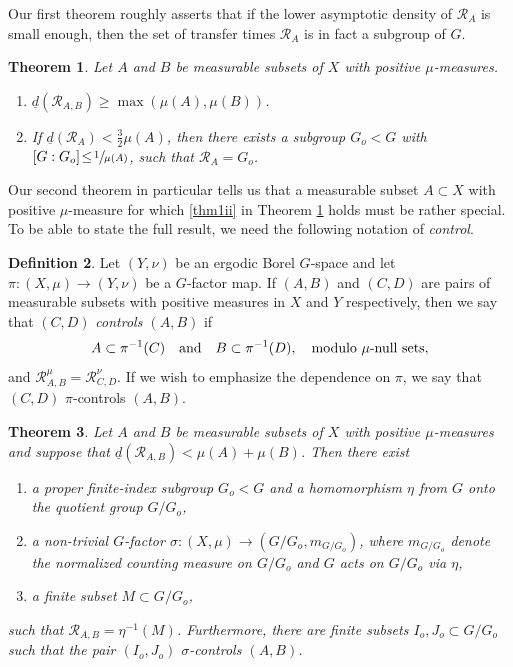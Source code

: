 \documentclass[10pt]{amsart}
\let\mathcal\mathscr
\newcommand{\cR}{\mathcal{R}}
\newcommand{\qand}{\quad\textup{and}\quad}
\theoremstyle{plain}
\newtheorem{theorem}{Theorem}[section]
\theoremstyle{definition}
\newtheorem{definition}[theorem]{Definition}
\begin{document}
Our first theorem roughly asserts that if the lower asymptotic density of $\cR_A$ is small enough, then the set of transfer times $\cR_A$ is in fact a
subgroup of $G$.
\begin{theorem}
\label{thm1}
Let $A$ and $B$ be measurable subsets of $X$ with positive $\mu$-measures.

\begin{enumerate}
\item\label{thm1i}
$\underline{d}(\cR_{A,B}) \geq \max(\mu(A),\mu(B))$.
\item\label{thm1ii}
If $\underline{d}(\cR_A)\!<\!\frac{3}{2} \mu(A)$, then there exists a subgroup $G_o\!<\!G$ with
$[G : G_o]\!\leq\!\sfrac{1}{\mu(A)}$, such that $\cR_A = G_o$.
\end{enumerate}
\end{theorem}

Our second theorem in particular tells us that a measurable subset $A \subset X$ with positive $\mu$-measure for which \eqref{thm1ii} in Theorem \ref{thm1} holds must be rather special. To be able to state the full result, we need the following notation of \emph{control}.

\begin{definition}
Let $(Y,\nu)$ be an ergodic Borel $G$-space and let $\pi : (X,\mu) \to (Y,\nu)$ be a $G$-factor map. If $(A,B)$ and $(C,D)$ are pairs of measurable
subsets with positive measures in $X$ and $Y$ respectively, then we say that $(C,D)$ \emph{controls $(A,B)$} if
\[
A \subset \pi^{-1}(C) \qand B \subset \pi^{-1}(D), \quad \textrm{modulo $\mu$-null sets},
\]
and $\cR^\mu_{A,B} = \cR^\nu_{C,D}$. If we wish to emphasize the dependence on $\pi$, we say that $(C,D)$ $\pi$-controls $(A,B)$.
\end{definition}


\begin{theorem}									
\label{thm2}
Let $A$ and $B$ be measurable subsets of $X$ with positive $\mu$-measures and suppose that $\underline{d}(\cR_{A,B}) < \mu(A) + \mu(B)$. Then there exist

\begin{enumerate}
\item
a proper finite-index subgroup $G_o < G$ and a homomorphism $\eta$ from $G$ onto the quotient group $G/G_o$,
\item
a non-trivial $G$-factor $\sigma : (X,\mu) \to (G/G_o,m_{G/G_o})$, where $m_{G/G_o}$ denote the normalized
counting measure on $G/G_o$ and $G$ acts on $G/G_o$ via $\eta$,
\item
a finite subset $M \subset G/G_o$,
\end{enumerate}
such that $\cR_{A,B} = \eta^{-1}(M)$. Furthermore, there are finite subsets $I_o, J_o \subset G/G_o$ such that
the pair $(I_o,J_o)$ $\sigma$-controls $(A,B)$.
\end{theorem}
\end{document}
